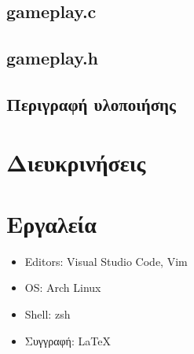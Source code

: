\documentclass{article}
\begin{document}
    \subsection{gameplay.c}
        

    \subsection{gameplay.h}
        

    \subsection{Περιγραφή υλοποιήσης}
    

\section{Διευκρινήσεις}



\section{Εργαλεία}

    \begin{itemize}
        \item Editors: Visual Studio Code, Vim
        \item OS: Arch Linux
        \item Shell: zsh
        \item Συγγραφή: \LaTeX
    \end{itemize}
\end{document}
